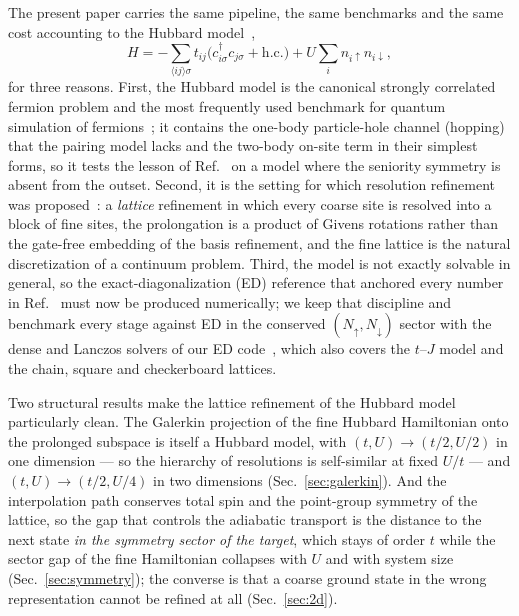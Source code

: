 \documentclass[
  aps,
  prc,
  reprint,
  superscriptaddress,
  floatfix,
  nofootinbib
]{revtex4-2}
\begin{document}
The present paper carries the same pipeline, the same benchmarks and the
same cost accounting to the Hubbard model~\cite{Hubbard1963,Arovas2022},
\begin{equation}
  H=-\sum_{\langle ij\rangle\sigma}t_{ij}\big(c^\dagger_{i\sigma}c_{j\sigma}+\mathrm{h.c.}\big)
   +U\sum_i n_{i\uparrow}n_{i\downarrow},
  \label{eq:hubbard}
\end{equation}
for three reasons.  First, the Hubbard model is the canonical strongly
correlated fermion problem and the most frequently used benchmark for
quantum simulation of
fermions~\cite{Wecker2015,Cade2020,Cai2020,Stanisic2022}; it contains the
one-body particle-hole channel (hopping) that the pairing model lacks and
the two-body on-site term in their simplest forms, so it tests the lesson of
Ref.~\cite{PHcompanion} on a model where the seniority symmetry is absent from
the outset.  Second, it is the setting for which resolution refinement was
proposed~\cite{Bogner2026}: a \emph{lattice} refinement in which every coarse
site is resolved into a block of fine sites, the prolongation is a product of
Givens rotations rather than the gate-free embedding of the basis refinement,
and the fine lattice is the natural discretization of a continuum problem.
Third, the model is not exactly solvable in general, so the
exact-diagonalization (ED) reference that anchored every number in
Ref.~\cite{EigenQPairing2026} must now be produced numerically; we keep that
discipline and benchmark every stage against ED in the conserved
$(N_\uparrow,N_\downarrow)$ sector with the dense and Lanczos solvers of our ED
code~\cite{HubbardNotebook}, which also covers the $t$--$J$ model and the
chain, square and checkerboard lattices.

Two structural results make the lattice refinement of the Hubbard model
particularly clean.  The Galerkin projection of the fine Hubbard Hamiltonian
onto the prolonged subspace is itself a Hubbard model, with $(t,U)\to(t/2,U/2)$
in one dimension --- so the hierarchy of resolutions is self-similar at
fixed $U/t$ --- and $(t,U)\to(t/2,U/4)$ in two dimensions
(Sec.~\ref{sec:galerkin}).  And the interpolation path conserves total spin
and the point-group symmetry of the lattice, so the gap that controls the
adiabatic transport is the distance to the next state \emph{in the symmetry
sector of the target}, which stays of order $t$ while the sector gap of the
fine Hamiltonian collapses with $U$ and with system size
(Sec.~\ref{sec:symmetry}); the converse is that a coarse ground state in the
wrong representation cannot be refined at all (Sec.~\ref{sec:2d}).
\end{document}
